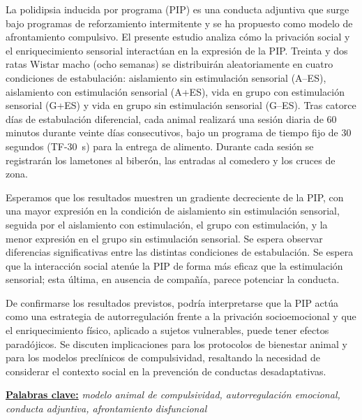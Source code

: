 \documentclass[12pt,a4paper]{article}
\begin{document}
    \begin{center}
    \begin{minipage}{0.9\textwidth}
    \noindent
    La polidipsia inducida por programa (PIP) es una conducta adjuntiva que surge bajo programas de reforzamiento intermitente y se ha propuesto como modelo de afrontamiento compulsivo. El presente estudio analiza cómo la privación social y el enriquecimiento sensorial interactúan en la expresión de la PIP. Treinta y dos ratas Wistar macho (ocho semanas) se distribuirán aleatoriamente en cuatro condiciones de estabulación: aislamiento sin estimulación sensorial (A--ES), aislamiento con estimulación sensorial (A+ES), vida en grupo con estimulación sensorial (G+ES) y vida en grupo sin estimulación sensorial (G--ES). Tras catorce días de estabulación diferencial, cada animal realizará una sesión diaria de 60 minutos durante veinte días consecutivos, bajo un programa de tiempo fijo de 30 segundos (TF-30~s) para la entrega de alimento. Durante cada sesión se registrarán los lametones al biberón, las entradas al comedero y los cruces de zona.
    
    Esperamos que los resultados muestren un gradiente decreciente de la PIP, con una mayor expresión en la condición de aislamiento sin estimulación sensorial, seguida por el aislamiento con estimulación, el grupo con estimulación, y la menor expresión en el grupo sin estimulación sensorial. Se espera observar diferencias significativas entre las distintas condiciones de estabulación. Se espera que la interacción social atenúe la PIP de forma más eficaz que la estimulación sensorial; esta última, en ausencia de compañía, parece potenciar la conducta.

    De confirmarse los resultados previstos, podría interpretarse que la PIP actúa como una estrategia de autorregulación frente a la privación socioemocional y que el enriquecimiento físico, aplicado a sujetos vulnerables, puede tener efectos paradójicos. Se discuten implicaciones para los protocolos de bienestar animal y para los modelos preclínicos de compulsividad, resaltando la necesidad de considerar el contexto social en la prevención de conductas desadaptativas.
    
    \vspace{2mm}
    \noindent
    \underline{\textbf{Palabras clave:}} \textit{modelo animal de compulsividad, autorregulación emocional, conducta adjuntiva, afrontamiento disfuncional}
    \end{minipage}
    \end{center}
    
\end{document}
